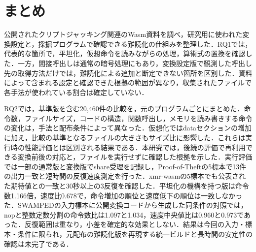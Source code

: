 \documentclass[submit,techrep]{ipsj}
\begin{document}
\section{まとめ}
公開されたクリプトジャッキング関連のWasm資料を調べ，研究用に使われた変換設定と，採掘プログラムで確認できる難読化の仕組みを整理した．RQ1では，代表的な箇所で，平坦化，仮想命令を読みながらの処理，算術式の置換を確認した．一方，間接呼出しは通常の暗号処理にもあり，変換設定版で観測した呼出し先の取得方法だけでは，難読化による追加と断定できない箇所を区別した．資料によって含まれる設定と確認できた根拠の範囲が異なり，収集されたファイルで各手法が使われている割合は確定していない．

RQ2では，基準版を含む20,460件の比較を，元のプログラムごとにまとめた．命令数，ファイルサイズ，コードの構造，関数呼出し，メモリを読み書きする命令の変化は，手法と配布条件によって異なった．仮想化ではdataセクションの増加に加え，比較の基準となるファイルの大きさもサイズ比に影響した．これらは実行時の性能評価とは区別される結果である．本研究では，後続の評価で再利用できる変換前後の対応と，ファイルを実行せずに確認した根拠を示した．実行評価では一部の通常版と変換版でshare受理を記録し，Proof-of-Theftの5標本で13件の出力一致と短時間の反復速度測定を行った．xmr-wasmの5標本でも公表された期待値との一致と30秒以上の3反復を確認した．平坦化の機構を持つ版は命令数1.166倍，速度比0.678で，命令増加の順位と速度低下の順位は一致しなかった．SWAMPEDの入力標本に公開変換コードから生成した同条件の対照では，nopと整数定数分割の命令数比は1.097と1.034，速度中央値比は0.960と0.973であった．反復範囲は重なり，小差を確定的な効果としない．結果は今回の入力・標本・条件に限られ，元配布の難読化版を再現する統一ビルドと長時間の安定性の確認は未完了である．


\end{document}

